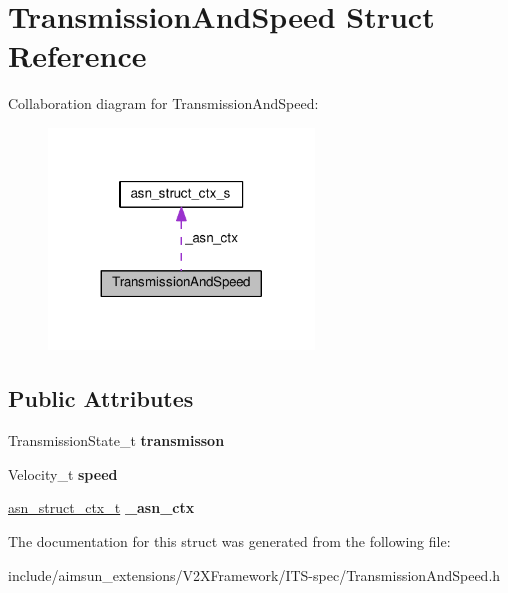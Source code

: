\hypertarget{structTransmissionAndSpeed}{}\section{Transmission\+And\+Speed Struct Reference}
\label{structTransmissionAndSpeed}


Collaboration diagram for Transmission\+And\+Speed\+:\nopagebreak
\begin{figure}[H]
\begin{center}
\leavevmode
\includegraphics[width=200pt]{structTransmissionAndSpeed__coll__graph}
\end{center}
\end{figure}
\subsection*{Public Attributes}
\begin{DoxyCompactItemize}
\item 
Transmission\+State\+\_\+t {\bfseries transmisson}\hypertarget{structTransmissionAndSpeed_a45b8322e88a097315bfa15e0f80a7eed}{}\label{structTransmissionAndSpeed_a45b8322e88a097315bfa15e0f80a7eed}

\item 
Velocity\+\_\+t {\bfseries speed}\hypertarget{structTransmissionAndSpeed_aa48c0a73d9ccc2d56dd4654a9144b2cd}{}\label{structTransmissionAndSpeed_aa48c0a73d9ccc2d56dd4654a9144b2cd}

\item 
\hyperlink{structasn__struct__ctx__s}{asn\+\_\+struct\+\_\+ctx\+\_\+t} {\bfseries \+\_\+asn\+\_\+ctx}\hypertarget{structTransmissionAndSpeed_a15132cad51d71d28c2adb1b971487d4d}{}\label{structTransmissionAndSpeed_a15132cad51d71d28c2adb1b971487d4d}

\end{DoxyCompactItemize}


The documentation for this struct was generated from the following file\+:\begin{DoxyCompactItemize}
\item 
include/aimsun\+\_\+extensions/\+V2\+X\+Framework/\+I\+T\+S-\/spec/Transmission\+And\+Speed.\+h\end{DoxyCompactItemize}
